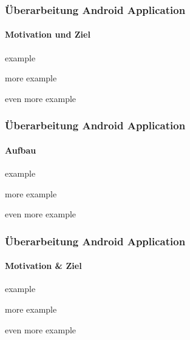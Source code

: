 \begin{frame}
\frametitle{Überarbeitung Android Application}
\framesubtitle{Motivation und Ziel}

\begin{block}{}
	example
\end{block}
\begin{block}{}
	more example
\end{block}
\begin{block}{}
	even more example
\end{block}
\end{frame}

\begin{frame}
	\frametitle{Überarbeitung Android Application}
	\framesubtitle{Aufbau}
	
	\begin{block}{}
		example
	\end{block}
	\begin{block}{}
		more example
	\end{block}
	\begin{block}{}
		even more example
	\end{block}
\end{frame}

\begin{frame}
	\frametitle{Überarbeitung Android Application}
	\framesubtitle{Motivation \& Ziel}
	
	\begin{block}{}
		example
	\end{block}
	\begin{block}{}
		more example
	\end{block}
	\begin{block}{}
		even more example
	\end{block}
\end{frame}